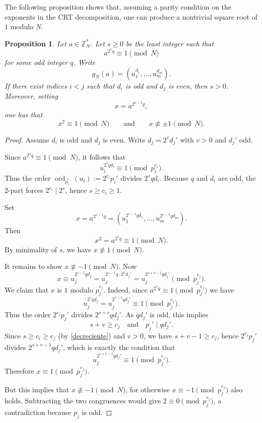 \documentclass[11pt,reqno]{article}
\numberwithin{equation}{section}
\theoremstyle{plain}
\newtheorem{proposition}[theorem]{Proposition}
\theoremstyle{definition}
\theoremstyle{remark}
\begin{document}
\medskip
The following proposition shows that, assuming a parity condition on the exponents in the CRT decomposition, one can produce a nontrivial square root of $1$ modulo $N.$
\begin{proposition}\label{prop:nt:nontrivial-sqrt}
Let $a\in\mathbb{Z}_N^\ast$.  Let $s\ge 0$ be the \emph{least} integer such that
\[
a^{2^{s}q}\equiv 1 \pmod N
\]
for some odd integer $q$.  Write
\[
g_N(a)=(u_1^{d_1},\dots,u_m^{d_m}).
\]
If there exist indices $i<j$ such that $d_i$ is odd and $d_j$ is even, then $s>0$.
Moreover, setting
\[
x=a^{2^{s-1}q},
\]
one has that
\begin{equation}\label{eq. congr property}
x^2\equiv 1 \pmod N
\qquad\text{and}\qquad
x\not\equiv \pm 1 \pmod N.
\end{equation}
\end{proposition}

\begin{proof}
Assume $d_i$ is odd and $d_j$ is even.  Write $d_j=2^v d_j'$ with $v>0$ and $d_j'$ odd.

Since $a^{2^s q}\equiv 1\pmod N$, it follows that
\[
u_i^{2^s q d_i}\equiv 1 \pmod{p_i^{e_i}}.
\]
Thus the order $\operatorname{ord}_{p_i^{e_i}}(u_i):=2^{c_i}p_i'$ divides $2^s q d_i$.
Because $q$ and $d_i$ are odd, the $2$-part forces $2^{c_i}\mid 2^s$, hence $s\ge c_i\ge 1$.

Set
\[
x=a^{2^{s-1}q}=(u_1^{2^{s-1}q d_1},\dots,u_m^{2^{s-1}q d_m}).
\]
Then
\[
x^2=a^{2^s q}\equiv 1 \pmod N.
\]
By minimality of $s$, we have $x\not\equiv 1\pmod N$.

It remains to show $x\not\equiv -1\pmod N$.
Now
\[
x \equiv u_j^{2^{s-1}q d_j}=u_j^{2^{s-1}q\cdot 2^v d_j'} = u_j^{2^{s+v-1}q d_j'} \pmod{p_j^{e_j}}.
\]
We claim that $x$ is $1$ modulo $p_j^{e_j}$.  Indeed, since $a^{2^s q}\equiv 1\pmod{p_j^{e_j}}$ we have
\[
u_j^{2^s q d_j}=u_j^{2^{s+v}q d_j'}\equiv 1\pmod{p_j^{e_j}}.
\]
Thus the order $2^{c_j}p_j'$ divides $2^{s+v}q d_j'$.  As $q d_j'$ is odd, this implies
\[
s+v\ge c_j
\quad\text{and}\quad
p_j' \mid q d_j'.
\]
Since $s\ge c_i\ge c_j$ (by \eqref{decreciente}) and $v>0$, we have $s+v-1\ge c_j$, hence $2^{c_j}p_j'$ divides
$2^{s+v-1}q d_j'$, which is exactly the condition that
\[
u_j^{2^{s+v-1}q d_j'}\equiv 1\pmod{p_j^{e_j}}.
\]
Therefore $x\equiv 1\pmod{p_j^{e_j}}$.

But this implies that $x\not\equiv -1\pmod N$, for otherwise
 $x\equiv -1 \pmod{p_j^{e_j}}$ also holds. Subtracting the two congruences would give
$2\equiv 0 \pmod{p_j^{e_j}}$, a contradiction because $p_j$ is odd.


\end{proof}
\end{document}
